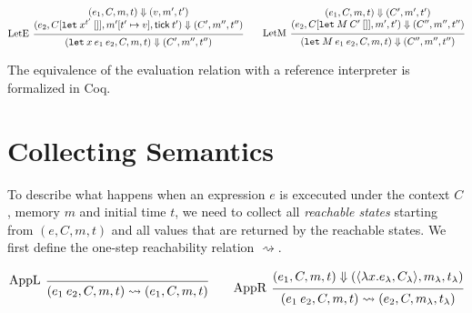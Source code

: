 \documentclass{article}
\theoremstyle{definition}
\newcommand*{\mem}{m}
\newcommand*{\tick}{\mathsf{tick}}
\begin{document}
\[
  \begin{prooftree}
    \hypo{
      \begin{matrix}
        (e_{1}, C, \mem, t)
        \Downarrow
        (v, \mem', t') \\
        (e_{2}, C[\mathtt{let}\:x^{t'}\:[]], \mem'[t'\mapsto v], \tick\:t')
        \Downarrow
        (C', \mem'', t'')
      \end{matrix}
    }
    \infer[left label=LetE]1{
    (\mathtt{let}\:x\:e_1\:e_2, C, \mem, t)
    \Downarrow
    (C', \mem'', t'')
    }
  \end{prooftree}\qquad
  \begin{prooftree}
    \hypo{
      \begin{matrix}
        (e_{1}, C, \mem, t)
        \Downarrow
        (C', \mem', t') \\
        (e_{2}, C[\mathtt{let}\:M\:C'\:[]], \mem', t')
        \Downarrow
        (C'', \mem'', t'')
      \end{matrix}
    }
    \infer[left label=LetM]1{
    (\mathtt{let}\:M\:e_{1}\:e_{2}, C, \mem, t)
    \Downarrow
    (C'', \mem'', t'')
    }
  \end{prooftree}
\]

The equivalence of the evaluation relation with a reference interpreter is formalized in Coq.

\section{Collecting Semantics}

To describe what happens when an expression $e$ is excecuted under the context $C$, memory $\mem$ and initial time $t$, we need to collect all \emph{reachable states} starting from $(e,C,\mem,t)$ and all values that are returned by the reachable states.
We first define the one-step reachability relation $\rightsquigarrow$.

\[
  \begin{prooftree}
    \infer[left label={AppL}]0{
    (e_{1}\:e_{2}, C, \mem, t)
    \rightsquigarrow
    (e_{1},C, \mem,t)
    }
  \end{prooftree}\qquad
  \begin{prooftree}
    \hypo{
      \begin{matrix}
        (e_{1}, C, \mem, t)
        \Downarrow
        (\langle\lambda x.e_{\lambda}, C_{\lambda}\rangle, \mem_{\lambda}, t_{\lambda})
      \end{matrix}
    }
    \infer[left label={AppR}]1{
    (e_{1}\:e_{2}, C, \mem, t)
    \rightsquigarrow
    (e_{2}, C, \mem_{\lambda}, t_{\lambda})
    }
  \end{prooftree}
\]
\end{document}
